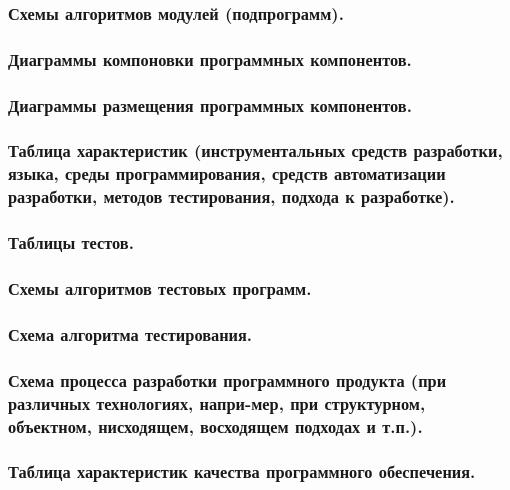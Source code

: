 \documentclass[12pt, left=30mm, right=15mm, top=20mm, bottom=20mm]{templateReportBMSTU}
\begin{document}
	\subsubsection{\textbf{Схемы алгоритмов модулей (подпрограмм).}}
	
	\subsubsection{\textbf{Диаграммы компоновки программных компонентов.}}

	\subsubsection{\textbf{Диаграммы размещения программных компонентов.}}

	\subsubsection{\textbf{Таблица характеристик (инструментальных средств разработки, языка, среды программирования, средств автоматизации разработки, методов тестирования, подхода к разработке).}}

	\subsubsection{\textbf{Таблицы тестов.}}

	\subsubsection{\textbf{Схемы алгоритмов тестовых программ.}}

	\subsubsection{\textbf{Схема алгоритма тестирования.}}

	\subsubsection{\textbf{Схема процесса разработки программного продукта (при различных технологиях, напри-мер, при структурном, объектном, нисходящем, восходящем подходах и т.п.).}}

	\subsubsection{\textbf{Таблица характеристик качества программного обеспечения.}}
\end{document}
